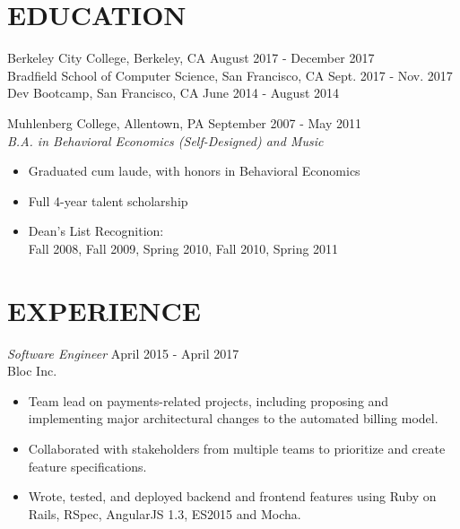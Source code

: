 \documentclass[margin, 10pt]{res} %
\begin{document}
\begin{resume}


\section{EDUCATION}
Berkeley City College, Berkeley, CA \hfill August 2017 - December 2017 \\
Bradfield School of Computer Science, San Francisco, CA \hfill Sept. 2017 - Nov. 2017 \\
Dev Bootcamp, San Francisco, CA \hfill June 2014 - August 2014

Muhlenberg College, Allentown, PA \hfill September 2007 - May 2011 \\
{\sl B.A. in Behavioral Economics (Self-Designed) and Music}
\begin{itemize} \itemsep -2pt %
\item Graduated cum laude, with honors in Behavioral Economics
\item Full 4-year talent scholarship
\item Dean’s List Recognition: \\
Fall 2008, Fall 2009, Spring 2010, Fall 2010, Spring 2011
\end{itemize}



\section{EXPERIENCE}

{\sl Software Engineer} \hfill April 2015 - April 2017 \\
Bloc Inc.
\begin{itemize} \itemsep -2pt %
\item Team lead on payments-related projects, including proposing and implementing major architectural changes to the automated billing model.
\item Collaborated with stakeholders from multiple teams to prioritize and create feature specifications.
\item Wrote, tested, and deployed backend and frontend features using Ruby on Rails, RSpec, AngularJS 1.3, ES2015 and Mocha.
\end{itemize}


\end{resume}
\end{document}
